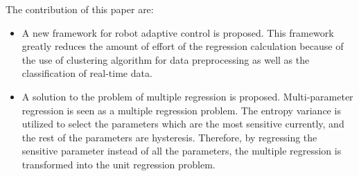 The contribution of this paper are:

\begin{itemize}
	\item A new framework for robot adaptive control is proposed.
 	This framework greatly reduces the amount of  effort of the regression calculation because of the use of clustering algorithm for data preprocessing as well as the classification of real-time data.
	\item A solution to the problem of multiple regression is proposed.
	Multi-parameter regression is seen as a multiple regression problem. The entropy variance is utilized to select the parameters which are the most sensitive currently, and the rest of the parameters are hysteresis. Therefore, by regressing the sensitive parameter instead of all the parameters, the multiple regression is transformed into the unit regression problem.
\end{itemize}



